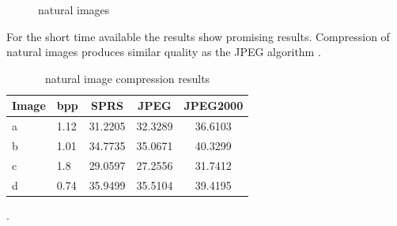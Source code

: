 \begin{figure}[h]
\centering

\hspace{5mm}
\hspace{5mm}
\hspace{5mm}
\caption{natural images}
\end{figure}

For the short time available the results show promising results. Compression of
natural images produces similar quality as the JPEG algorithm
.

\begin{table}[h]
\centering

\begin{tabular}{| l l | c | c | c|}
\hline\hline
Image & bpp & SPRS & JPEG & JPEG2000 \\
\hline
a & 1.12 & 31.2205 & 32.3289 & 36.6103 \\
b & 1.01 & 34.7735 & 35.0671 & 40.3299 \\
c & 1.8  & 29.0597 & 27.2556 & 31.7412 \\
d & 0.74  & 35.9499 & 35.5104 & 39.4195 \\
\hline
\end{tabular}
\caption{natural image compression results}
\label{tab:compression1}.
\end{table}

